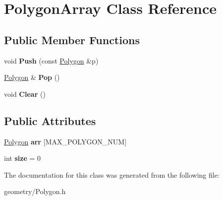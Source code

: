 \hypertarget{class_polygon_array}{}\section{Polygon\+Array Class Reference}
\label{class_polygon_array}
\subsection*{Public Member Functions}
\begin{DoxyCompactItemize}
\item 
\mbox{\label{class_polygon_array_a333428cbdfcb87eb440f3432676f451d}} 
void {\bfseries Push} (const \mbox{\hyperlink{class_polygon}{Polygon}} \&p)
\item 
\mbox{\label{class_polygon_array_a9267ce185f4c7f531a97ae34dc0ca3be}} 
\mbox{\hyperlink{class_polygon}{Polygon}} \& {\bfseries Pop} ()
\item 
\mbox{\label{class_polygon_array_a70414ec458869e24c2e4445580645e3c}} 
void {\bfseries Clear} ()
\end{DoxyCompactItemize}
\subsection*{Public Attributes}
\begin{DoxyCompactItemize}
\item 
\mbox{\label{class_polygon_array_aa0414a7a6512a73053e4f159e923720b}} 
\mbox{\hyperlink{class_polygon}{Polygon}} {\bfseries arr} \mbox{[}M\+A\+X\+\_\+\+P\+O\+L\+Y\+G\+O\+N\+\_\+\+N\+UM\mbox{]}
\item 
\mbox{\label{class_polygon_array_a59e553a53cec4121b3105ecb31e72790}} 
int {\bfseries size} = 0
\end{DoxyCompactItemize}


The documentation for this class was generated from the following file\+:\begin{DoxyCompactItemize}
\item 
geometry/Polygon.\+h\end{DoxyCompactItemize}
